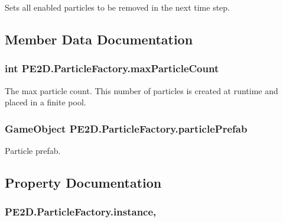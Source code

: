 Sets all enabled particles to be removed in the next time step. 



\subsection{Member Data Documentation}
\hypertarget{class_p_e2_d_1_1_particle_factory_a7a8905551b65537a74461cddeaaac5d3}{}
\subsubsection[{max\+Particle\+Count}]{\setlength{\rightskip}{0pt plus 5cm}int P\+E2\+D.\+Particle\+Factory.\+max\+Particle\+Count}\label{class_p_e2_d_1_1_particle_factory_a7a8905551b65537a74461cddeaaac5d3}


The max particle count. This number of particles is created at runtime and placed in a finite pool. 

\hypertarget{class_p_e2_d_1_1_particle_factory_a7431706eb3ca0363ebfa1936384fa8ca}{}
\subsubsection[{particle\+Prefab}]{\setlength{\rightskip}{0pt plus 5cm}Game\+Object P\+E2\+D.\+Particle\+Factory.\+particle\+Prefab}\label{class_p_e2_d_1_1_particle_factory_a7431706eb3ca0363ebfa1936384fa8ca}


Particle prefab. 



\subsection{Property Documentation}
\hypertarget{class_p_e2_d_1_1_particle_factory_a5ee02796828431320c6f8a70a8456feb}{}
\subsubsection[{instance}]{ P\+E2\+D.\+Particle\+Factory.\+instance\hspace{0.3cm}{\ttfamily [static]}, {\ttfamily [get]}}\label{class_p_e2_d_1_1_particle_factory_a5ee02796828431320c6f8a70a8456feb}


